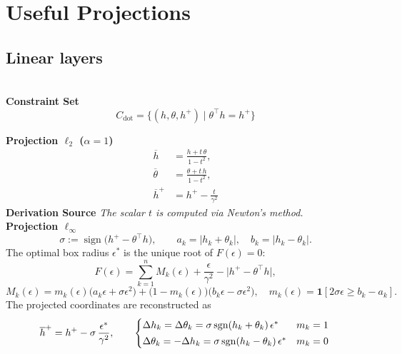\chapter{Useful Projections}
\label{sec:projections}
\section{Linear layers}
\label{sec:linear_layer}
\begin{tcolorbox}[projectioncard, title=Linear Layer]\\
\textbf{Constraint Set}
\[
C_{\mathrm{dot}} = \{(h, \theta, h^+) \mid \theta^\top h = h^+\}
\]
 
\textbf{Projection $\ell_2$ ($\alpha=1$)}
\[
\begin{aligned}
\overline{h} &= \frac{h + t\,\theta}{1-t^2}, \\
\overline{\theta} &= \frac{\theta + t\,h}{1-t^2}, \\
\overline{h}^+ &= h^+ - \frac{t}{\gamma^2}
\end{aligned}
\]
\textbf{Derivation Source}
\cite{bauschke_bilinear, elser2019learning, bergmeister2025projection}
\textit{The scalar $t$ is computed via Newton's method.}
\vspace{1.0em}
\\
\textbf{Projection $\ell_\infty$}
\[
\sigma := \operatorname{sign}\!\bigl(h^{+}-\theta^\top h\bigr),\qquad
a_k=|h_k+\theta_k|,\quad b_k=|h_k-\theta_k|.
\]
The optimal box radius $\epsilon^*$ is the unique root of $F(\epsilon)=0$:
\[
F(\epsilon)=\sum_{k=1}^{n} M_k(\epsilon)+\frac{\epsilon}{\gamma^2}-\bigl|h^{+}-\theta^\top h\bigr|,
\]
\[
M_k(\epsilon)=m_k(\epsilon)\bigl(a_k\epsilon+\sigma\epsilon^2\bigr)
            +\bigl(1-m_k(\epsilon)\bigr)\bigl(b_k\epsilon-\sigma\epsilon^2\bigr),
\quad
m_k(\epsilon)=\mathbf{1}\!\left[2\sigma\epsilon \ge b_k-a_k\right].
\]
The projected coordinates are reconstructed as
\[
\overline{h}^{+}=h^{+}-\sigma\,\frac{\epsilon^*}{\gamma^2},\qquad
\begin{cases}
\Delta h_k=\Delta\theta_k=\sigma\,\mathrm{sgn}(h_k+\theta_k)\,\epsilon^* & m_k=1\\[2pt]
\Delta\theta_k=-\Delta h_k=\sigma\,\mathrm{sgn}(h_k-\theta_k)\,\epsilon^* & m_k=0
\end{cases}
\\
\\
\]
\end{tcolorbox}
